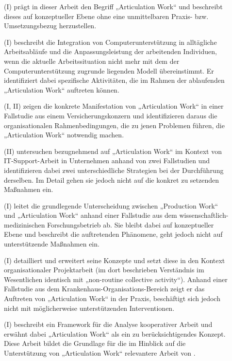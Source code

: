 \begin{description}
	\item[\citet{Strauss85}] (I) prägt in dieser Arbeit den Begriff „Articulation Work“ und beschreibt dieses auf konzeptueller Ebene ohne eine unmittelbaren Praxis- bzw. Umsetzungsbezug herzustellen.
	\item[\citet{Gasser86}] (I) beschreibt die Integration von Computerunterstützung in alltägliche Arbeitsabläufe und die Anpassungsleistung der arbeitenden Individuen, wenn die aktuelle Arbeitssituation nicht mehr mit dem der Computerunterstützung zugrunde liegenden Modell übereinstimmt. Er identifiziert dabei spezifische Aktivitäten, die im Rahmen der ablaufenden „Articulation Work“ auftreten können.
	\item[\citet{Gerson86}] (I, II) zeigen die konkrete Manifestation von „Articulation Work“ in einer Fallstudie aus einem Versicherungskonzern und identifizieren daraus die organisationalen Rahmenbedingungen, die zu jenen Problemen führen, die „Articulation Work“ notwendig machen.
	\item[\citet{Bendifallah87}] (II) untersuchen bezugnehmend auf \citet{Gasser86} „Articulation Work“ im Kontext von IT-Support-Arbeit in Unternehmen anhand von zwei Fallstudien und identifizieren dabei zwei unterschiedliche Strategien bei der Durchführung derselben. Im Detail gehen sie jedoch nicht auf die konkret zu setzenden Maßnahmen ein.
	\item[\citet{Fujimura87}] (I) leitet die grundlegende Unterscheidung zwischen „Production Work“ und „Articulation Work“ anhand einer Fallstudie aus dem wissen\-schaftlich-medizinischen Forschungsbetrieb ab. Sie bleibt dabei auf konzeptueller Ebene und beschreibt die auftretenden Phänomene, geht jedoch nicht auf unterstützende Maßnahmen ein.
	\item[\citet{Strauss88}] (I) detailliert und erweitert seine Konzepte und setzt diese in den Kontext organisationaler Projektarbeit (im dort beschrieben Verständnis im Wesentlichen identisch mit „non-routine collective activity“). Anhand einer Fallstudie aus dem Krankenhaus-Organisations-Bereich zeigt er das Auftreten von „Articulation Work“ in der Praxis, beschäftigt sich jedoch nicht mit möglicherweise unterstützenden Interventionen.
	\item[\citet{Schmidt90}] (I) beschreibt ein Framework für die Analyse kooperativer Arbeit und erwähnt dabei „Articulation Work“ als ein zu berücksichtigendes Konzept. Diese Arbeit bildet die Grundlage für die im Hinblick auf die Unterstützung von „Articulation Work“ relevantere Arbeit von \citet{Schmidt92}.

\end{description}
